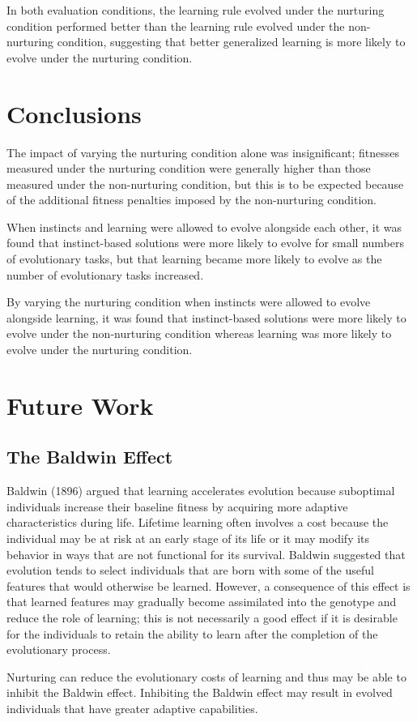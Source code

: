 \documentclass[master]{outhesis}
\begin{document}
In both evaluation conditions, the learning rule evolved under the nurturing condition performed better than the learning rule evolved under the non-nurturing condition, suggesting that better generalized learning is more likely to evolve under the nurturing condition.

\chapter{Conclusions}

The impact of varying the nurturing condition alone was insignificant; fitnesses measured under the nurturing condition were generally higher than those measured under the non-nurturing condition, but this is to be expected because of the additional fitness penalties imposed by the non-nurturing condition.

When instincts and learning were allowed to evolve alongside each other, it was found that instinct-based solutions were more likely to evolve for small numbers of evolutionary tasks, but that learning became more likely to evolve as the number of evolutionary tasks increased.

By varying the nurturing condition when instincts were allowed to evolve alongside learning, it was found that instinct-based solutions were more likely to evolve under the non-nurturing condition whereas learning was more likely to evolve under the nurturing condition.

\chapter{Future Work}

\section{The Baldwin Effect}

Baldwin (1896) argued that learning accelerates evolution because suboptimal individuals increase their baseline fitness by acquiring more adaptive characteristics during life. 
Lifetime learning often involves a cost because the individual may be at risk at an early stage of its life or it may modify its behavior in ways that are not functional for its survival.
Baldwin suggested that evolution tends to select individuals that are born with some of the useful features that would otherwise be learned.
However, a consequence of this effect is that learned features may gradually become assimilated into the genotype and reduce the role of learning;
this is not necessarily a good effect if it is desirable for the individuals to retain the ability to learn after the completion of the evolutionary process. \cite{Floreano:2008wv} 

Nurturing can reduce the evolutionary costs of learning and thus may be able to inhibit the Baldwin effect.
Inhibiting the Baldwin effect may result in evolved individuals that have greater adaptive capabilities.

{}


\makebackmatter
\end{document}
